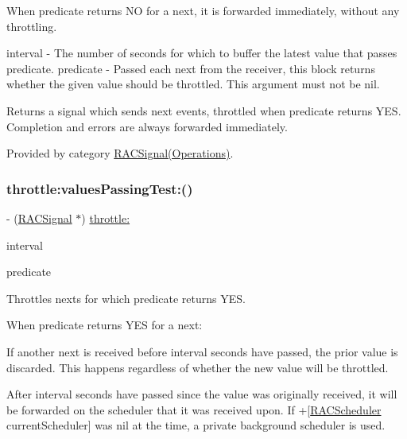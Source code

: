 When {\ttfamily predicate} returns NO for a {\ttfamily next}, it is forwarded immediately, without any throttling.

interval -\/ The number of seconds for which to buffer the latest value that passes {\ttfamily predicate}. predicate -\/ Passed each {\ttfamily next} from the receiver, this block returns whether the given value should be throttled. This argument must not be nil.

Returns a signal which sends {\ttfamily next} events, throttled when {\ttfamily predicate} returns Y\+ES. Completion and errors are always forwarded immediately. 

Provided by category \mbox{\hyperlink{category_r_a_c_signal_07_operations_08_a0310fbee83b4ca1b1daca25daf24f41b}{R\+A\+C\+Signal(\+Operations)}}.

\mbox{\label{interface_r_a_c_signal_a0310fbee83b4ca1b1daca25daf24f41b}} 
\subsubsection{\texorpdfstring{throttle\+:values\+Passing\+Test\+:()}{throttle:valuesPassingTest:()}\hspace{0.1cm}{\footnotesize\ttfamily [2/3]}}
{\footnotesize\ttfamily -\/ (\mbox{\hyperlink{interface_r_a_c_signal}{R\+A\+C\+Signal}} $\ast$) \mbox{\hyperlink{category_r_a_c_signal_07_operations_08_a2542ae804d05ec734d0f4d2fa8c3ac93}{throttle\+:}} \begin{DoxyParamCaption}\item[{(N\+S\+Time\+Interval)}]{interval }\item[{valuesPassingTest:(B\+O\+OL($^\wedge$)(id next))}]{predicate }\end{DoxyParamCaption}}

Throttles {\ttfamily next}s for which {\ttfamily predicate} returns Y\+ES.

When {\ttfamily predicate} returns Y\+ES for a {\ttfamily next}\+:


\begin{DoxyEnumerate}
\item If another {\ttfamily next} is received before {\ttfamily interval} seconds have passed, the prior value is discarded. This happens regardless of whether the new value will be throttled.
\item After {\ttfamily interval} seconds have passed since the value was originally received, it will be forwarded on the scheduler that it was received upon. If +\mbox{[}\mbox{\hyperlink{interface_r_a_c_scheduler}{R\+A\+C\+Scheduler}} current\+Scheduler\mbox{]} was nil at the time, a private background scheduler is used.
\end{DoxyEnumerate}

